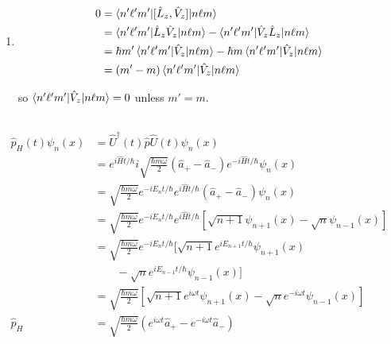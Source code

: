 \documentclass{article}
\begin{document}
\begin{enumerate}
  \item

        \begin{align*}
          0 & = \braket{n' \ell' m' | [\hat{L}_z, \hat{V}_z] | n \ell m}                                                      \\
            & = \braket{n' \ell' m' | \hat{L}_z \hat{V}_z | n \ell m} - \braket{n' \ell' m' | \hat{V}_z \hat{L}_z | n \ell m} \\
            & = \hbar m' \braket{n' \ell' m' | \hat{V}_z | n \ell m} - \hbar m \braket{n' \ell' m' | \hat{V}_z | n \ell m}    \\
            & = (m' - m) \braket{n' \ell' m' | \hat{V}_z | n \ell m}
        \end{align*}

        so $\braket{n' \ell' m' | \hat{V}_z | n \ell m} = 0$ unless $m' = m$.
\end{enumerate}

\setcounter{subsection}{25}
\subsection{}

\begin{align*}
  \hat{p}_H(t) \psi_n(x) & = \hat{U}^\dag(t) \hat{p} \hat{U}(t) \psi_n(x)                                                                                           \\
                         & = e^{i \hat{H} t / \hbar} i \sqrt{\frac{\hbar m \omega}{2}} (\hat{a}_+ - \hat{a}_-) e^{-i \hat{H} t / \hbar} \psi_n(x)                   \\
                         & = \sqrt{\frac{\hbar m \omega}{2}} e^{-i E_n t / \hbar} e^{i \hat{H} t / \hbar} (\hat{a}_+ - \hat{a}_-) \psi_n(x)                         \\
                         & = \sqrt{\frac{\hbar m \omega}{2}} e^{-i E_n t / \hbar} e^{i \hat{H} t / \hbar} [\sqrt{n + 1} \psi_{n + 1}(x) - \sqrt{n} \psi_{n - 1}(x)] \\
                         & = \sqrt{\frac{\hbar m \omega}{2}} e^{-i E_n t / \hbar} [\sqrt{n + 1} e^{i E_{n + 1} t / \hbar} \psi_{n + 1}(x)                           \\
                         & \qquad - \sqrt{n} e^{i E_{n - 1} t / \hbar} \psi_{n - 1}(x)]                                                                             \\
                         & = \sqrt{\frac{\hbar m \omega}{2}} [\sqrt{n + 1} e^{i \omega t} \psi_{n + 1}(x) - \sqrt{n} e^{-i \omega t} \psi_{n - 1}(x)]               \\
  \hat{p}_H              & = \sqrt{\frac{\hbar m \omega}{2}} (e^{i \omega t} \hat{a}_+ - e^{-i \omega t} \hat{a}_-)
\end{align*}
\end{document}
